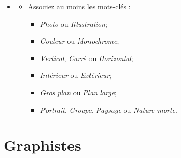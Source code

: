 \documentclass[12pt,nofoldmark,notumble]{leaflet}
\begin{document}
\begin{center}
  \setlength{\fboxsep}{0pt}%
  \setlength{\fboxrule}{0pt}%
\end{center}

\vspace*{\fill}

\begin{itemize}
  \item[]
  \begin{itemize}
  \item Associez au moins les mots-clés :

    \begin{itemize}
    \item \emph{Photo} ou \emph{Illustration};
    \item \emph{Couleur} ou \emph{Monochrome};
    \item \emph{Vertical}, \emph{Carré} ou \emph{Horizontal};
    \item \emph{Intérieur} ou \emph{Extérieur};
    \item \emph{Gros plan} ou \emph{Plan large};
    \item \emph{Portrait}, \emph{Groupe}, \emph{Paysage} ou \emph{Nature morte}.
    \end{itemize}
  \end{itemize}
\end{itemize}
\vspace*{\fill}


\clearpage

\section{\faPaintBrush Graphistes}
\end{document}
